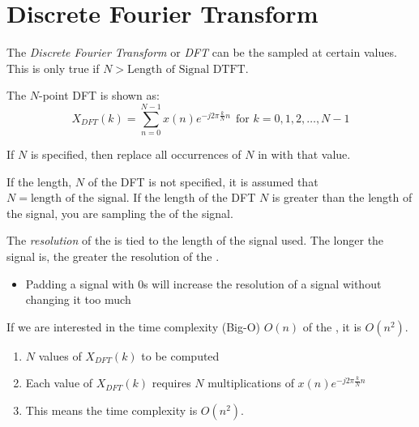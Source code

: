 \section{Discrete Fourier Transform}\label{sec:DFT}
\begin{definition}\label{def:DFT}
  The \emph{Discrete Fourier Transform} or \emph{DFT} can be the  sampled at certain values.
  This is only true if $N > \text{Length of Signal DTFT}$.

  The $N$-point DFT is shown as:
  \begin{equation}\label{eq:DFT}
    X_{DFT}(k) = \sum\limits_{n=0}^{N-1} x(n) e^{-j 2\pi \frac{k}{N} n} \:\: \text{for } k=0, 1, 2, \ldots, N-1
  \end{equation}

  If $N$ is specified, then replace all occurrences of $N$ in  with that value.

  \begin{remark}
    If the length, $N$ of the DFT is not specified, it is assumed that $N = \text{length of the signal}$.
    If the length of the DFT $N$ is greater than the length of the signal, you are sampling the  of the signal.
  \end{remark}

  \begin{remark}\label{rmk:DFT_Resolution}
    The \emph{resolution} of the  is tied to the length of the signal used.
    The longer the signal is, the greater the resolution of the .
    \begin{itemize}[noitemsep]
    \item Padding a signal with 0s will increase the resolution of a signal without changing it too much
    \end{itemize}
  \end{remark}

  \begin{remark}\label{rmk:DFT_Time_Complexity}
    If we are interested in the time complexity (Big-O) $O(n)$ of the , it is $O(n^{2})$.
    \begin{enumerate}[noitemsep]
    \item $N$ values of $X_{DFT}(k)$ to be computed
    \item Each value of $X_{DFT}(k)$ requires $N$ multiplications of $x(n) e^{-j 2\pi \frac{k}{N} n}$
    \item This means the time complexity is $O(n^{2})$.
    \end{enumerate}
  \end{remark}
\end{definition}


